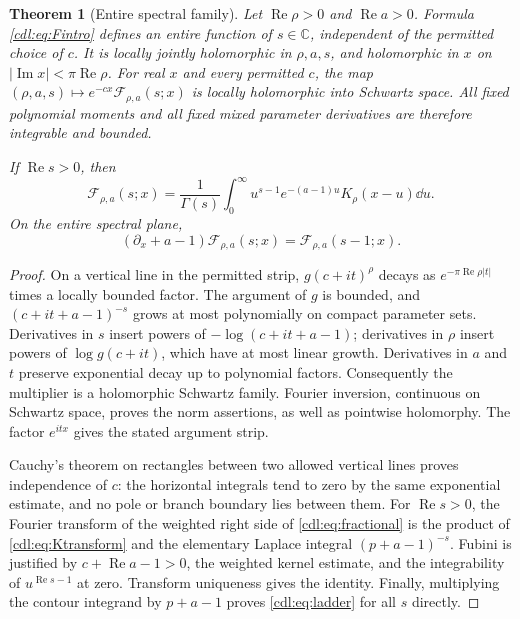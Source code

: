 \documentclass[11pt,letterpaper]{article}
\numberwithin{equation}{section}
\newtheorem{theorem}{Theorem}[section]
\theoremstyle{definition}\newtheorem{definition}[theorem]{Definition}
\theoremstyle{remark}\newtheorem{remark}[theorem]{Remark}
\newcommand{\C}{\mathbb C}\newcommand{\R}{\mathbb R}
\newcommand{\Rea}{\operatorname{Re}}\newcommand{\Ima}{\operatorname{Im}}
\newcommand{\F}{\mathcal F}\newcommand{\E}{\mathcal E}
\begin{document}
\begin{theorem}[Entire spectral family]\label{cdl:thm:spectral}
Let $\Rea\rho>0$ and $\Rea a>0$. Formula
\eqref{cdl:eq:Fintro} defines an entire function of $s\in\C$, independent
of the permitted choice of $c$. It is locally jointly holomorphic in
$\rho,a,s$, and holomorphic in $x$ on $|\Ima x|<\pi\Rea\rho$.
For real $x$ and every permitted $c$, the map
$(\rho,a,s)\mapsto e^{-cx}\F_{\rho,a}(s;x)$ is locally holomorphic into
Schwartz space. All fixed polynomial moments and all fixed mixed
parameter derivatives are therefore integrable and bounded.

If $\Rea s>0$, then
\begin{equation}\label{cdl:eq:fractional}
 \F_{\rho,a}(s;x)=\frac1{\Gamma(s)}\int_0^\infty
 u^{s-1}e^{-(a-1)u}K_\rho(x-u)\dd u.
\end{equation}
On the entire spectral plane,
\begin{equation}\label{cdl:eq:ladder}
 (\partial_x+a-1)\F_{\rho,a}(s;x)=\F_{\rho,a}(s-1;x).
\end{equation}
\end{theorem}
\begin{proof}
On a vertical line in the permitted strip, $g(c+it)^\rho$ decays as
$e^{-\pi\Rea\rho|t|}$ times a locally bounded factor. The argument of
$g$ is bounded, and $(c+it+a-1)^{-s}$ grows at most polynomially on
compact parameter sets. Derivatives in $s$ insert powers of
$-\log(c+it+a-1)$; derivatives in $\rho$ insert powers of
$\log g(c+it)$, which have at most linear growth. Derivatives in $a$
and $t$ preserve exponential decay up to polynomial factors. Consequently
the multiplier is a holomorphic Schwartz family. Fourier inversion,
continuous on Schwartz space, proves the norm assertions, as well as
pointwise holomorphy. The factor $e^{itx}$ gives the stated argument strip.

Cauchy's theorem on rectangles between two allowed vertical lines proves
independence of $c$: the horizontal integrals tend to zero by the same
exponential estimate, and no pole or branch boundary lies between them.
For $\Rea s>0$, the Fourier transform of the weighted right side of
\eqref{cdl:eq:fractional} is the product of \eqref{cdl:eq:Ktransform}
and the elementary Laplace integral $(p+a-1)^{-s}$. Fubini is justified
by $c+\Rea a-1>0$, the weighted kernel estimate, and the integrability
of $u^{\Rea s-1}$ at zero. Transform uniqueness gives the identity.
Finally, multiplying the contour integrand by $p+a-1$ proves
\eqref{cdl:eq:ladder} for all $s$ directly.
\end{proof}
\end{document}
